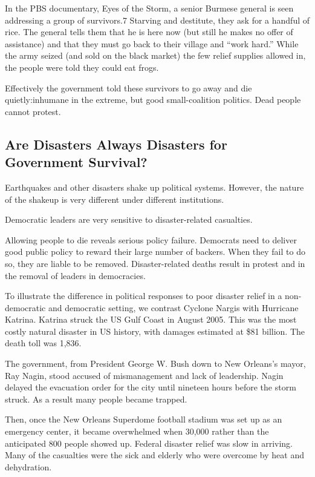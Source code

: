 \documentclass[10pt]{article}
\begin{document}
{\large In the PBS documentary, Eyes of the Storm, a senior Burmese general is
seen addressing a group of survivors.7 Starving and destitute, they ask for a
handful of rice. The general tells them that he is here now (but still he makes
no offer of assistance) and that they must go back to their village and ``work
hard.'' While the army seized (and sold on the black market) the few relief
supplies allowed in, the people were told they could eat frogs.}

{\large Effectively the government told these survivors to go away and die
quietly:inhumane in the extreme, but good small-coalition politics. Dead people
cannot protest.}

\subsection{Are Disasters Always Disasters for Government Survival?}

{\large Earthquakes and other disasters shake up political systems. However, the
nature of the shakeup is very different under different institutions.}

{\large Democratic leaders are very sensitive to disaster-related casualties.}

{\large Allowing people to die reveals serious policy failure. Democrats need to
deliver good public policy to reward their large number of backers. When they
fail to do so, they are liable to be removed. Disaster-related deaths result in
protest and in the removal of leaders in democracies.}

{\large To illustrate the difference in political responses to poor disaster
relief in a non-democratic and democratic setting, we contrast Cyclone Nargis
with Hurricane Katrina. Katrina struck the US Gulf Coast in August 2005. This was
the most costly natural disaster in US history, with damages estimated at \$81
billion. The death toll was 1,836.}

{\large The government, from President George W. Bush down to New Orleans's
mayor, Ray Nagin, stood accused of mismanagement and lack of leadership. Nagin
delayed the evacuation order for the city until nineteen hours before the storm
struck. As a result many people became trapped.}

{\large Then, once the New Orleans Superdome football stadium was set up as an
emergency center, it became overwhelmed when 30,000 rather than the anticipated
800 people showed up. Federal disaster relief was slow in arriving. Many of the
casualties were the sick and elderly who were overcome by heat and dehydration.}
\end{document}
